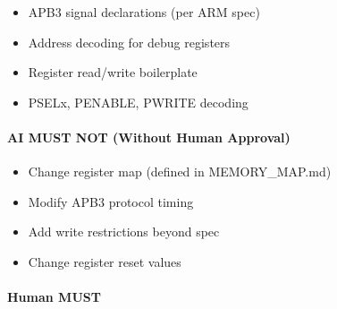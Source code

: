 \begin{record}

\begin{itemize}
\tightlist
\item
  APB3 signal declarations (per ARM spec)
\item
  Address decoding for debug registers
\item
  Register read/\allowbreak{}write boilerplate
\item
  PSELx, PENABLE, PWRITE decoding
\end{itemize}

\end{record}

\paragraph{\texorpdfstring{\warn{} AI MUST NOT (Without Human
Approval)}{ AI MUST NOT (Without Human Approval)}}\label{cr:status:phase1-ai-human-responsibilities:warning-ai-must-not-without-human-approval-7}

\begin{record}

\begin{itemize}
\tightlist
\item
  Change register map (defined in MEMORY\_\allowbreak{}MAP.md)
\item
  Modify APB3 protocol timing
\item
  Add write restrictions beyond spec
\item
  Change register reset values
\end{itemize}

\end{record}

\paragraph{\texorpdfstring{\hold{} Human MUST}{ Human MUST}}\label{cr:status:phase1-ai-human-responsibilities:raised-hand-human-must-7}

